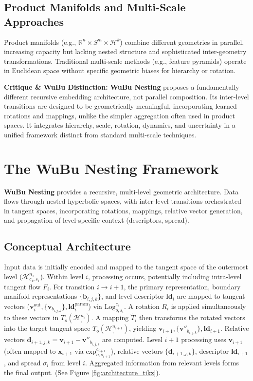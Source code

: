 \documentclass[11pt, twoside]{article} %
\newcommand{\HypSpace}[3]{\mathcal{H}^{#1}_{#2, #3}} %
\newcommand{\R}{\mathbb{R}} %
\newcommand{\wubu}{\textbf{WuBu Nesting}} %
\begin{document}
\subsection{Product Manifolds and Multi-Scale Approaches}
\label{subsec:product_multiscale}

Product manifolds \cite{GuEtAl2019} (e.g., $\R^n \times S^m \times \mathcal{H}^k$) combine different geometries in parallel, increasing capacity but lacking nested structure and sophisticated inter-geometry transformations. Traditional multi-scale methods (e.g., feature pyramids) operate in Euclidean space without specific geometric biases for hierarchy or rotation.

\textbf{Critique \& WuBu Distinction:} \wubu{} proposes a fundamentally different recursive embedding architecture, not parallel composition. Its inter-level transitions are designed to be geometrically meaningful, incorporating learned rotations and mappings, unlike the simpler aggregation often used in product spaces. It integrates hierarchy, scale, rotation, dynamics, and uncertainty in a unified framework distinct from standard multi-scale techniques.

\section{The WuBu Nesting Framework}
\label{sec:framework}

\wubu{} provides a recursive, multi-level geometric architecture. Data flows through nested hyperbolic spaces, with inter-level transitions orchestrated in tangent spaces, incorporating rotations, mappings, relative vector generation, and propagation of level-specific context (descriptors, spread).

\subsection{Conceptual Architecture}
\label{subsec:conceptual_architecture}

Input data is initially encoded and mapped to the tangent space of the outermost level ($\HypSpace{n_1}{c_1}{s_1}$). Within level $i$, processing occurs, potentially including intra-level tangent flow $F_i$. For transition $i \rightarrow i+1$, the primary representation, boundary manifold representations $\{\mathbf{b}_{i,j,k}\}$, and level descriptor $\mathbf{ld}_i$ are mapped to tangent vectors ($\mathbf{v}_i^{\text{out}}, \{\mathbf{v}_{b_{i,j,k}}\}, \mathbf{ld}_i^{\text{param}}$) via $\text{Log}_{o,s_i}^{c_i}$. A rotation $R_i$ is applied simultaneously to these vectors in $T_o(\HypSpace{n_i}{}{})$. A mapping $\tilde{T}_i$ then transforms the rotated vectors into the target tangent space $T_o(\HypSpace{n_{i+1}}{}{})$, yielding $\mathbf{v}_{i+1}, \{\mathbf{v}''_{b_{i,j,k}}\}, \mathbf{ld}_{i+1}$. Relative vectors $\mathbf{d}_{i+1, j, k} = \mathbf{v}_{i+1} - \mathbf{v}''_{b_{i,j,k}}$ are computed. Level $i+1$ processing uses $\mathbf{v}_{i+1}$ (often mapped to $\mathbf{x}_{i+1}$ via $\text{exp}_{o,s_{i+1}}^{c_{i+1}}$), relative vectors $\{\mathbf{d}_{i+1, j, k}\}$, descriptor $\mathbf{ld}_{i+1}$, and spread $\sigma_i$ from level $i$. Aggregated information from relevant levels forms the final output. (See Figure \ref{fig:architecture_tikz}).
\end{document}
